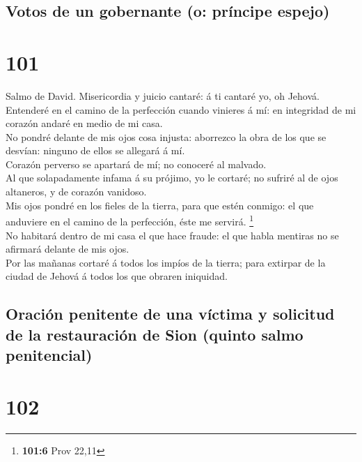 \hypertarget{votos-de-un-gobernante-o-pruxedncipe-espejo}{%
\subsection{Votos de un gobernante (o: príncipe
espejo)}\label{votos-de-un-gobernante-o-pruxedncipe-espejo}}

\hypertarget{section-100}{%
\section{101}\label{section-100}}

 Salmo de David. Misericordia y juicio cantaré: á ti
cantaré yo, oh Jehová.\\
 Entenderé en el camino de la perfección cuando vinieres á
mí: en integridad de mi corazón andaré en medio de mi casa.\\
 No pondré delante de mis ojos cosa injusta: aborrezco la
obra de los que se desvían: ninguno de ellos se allegará á mí.\\
 Corazón perverso se apartará de mí; no conoceré al
malvado.\\
 Al que solapadamente infama á su prójimo, yo le cortaré;
no sufriré al de ojos altaneros, y de corazón vanidoso.\\
 Mis ojos pondré en los fieles de la tierra, para que
estén conmigo: el que anduviere en el camino de la perfección, éste me
servirá. \footnote{\textbf{101:6} Prov 22,11}\\
 No habitará dentro de mi casa el que hace fraude: el que
habla mentiras no se afirmará delante de mis ojos.\\
 Por las mañanas cortaré á todos los impíos de la tierra;
para extirpar de la ciudad de Jehová á todos los que obraren iniquidad.

\hypertarget{oraciuxf3n-penitente-de-una-vuxedctima-y-solicitud-de-la-restauraciuxf3n-de-sion-quinto-salmo-penitencial}{%
\subsection{Oración penitente de una víctima y solicitud de la
restauración de Sion (quinto salmo
penitencial)}\label{oraciuxf3n-penitente-de-una-vuxedctima-y-solicitud-de-la-restauraciuxf3n-de-sion-quinto-salmo-penitencial}}

\hypertarget{section-101}{%
\section{102}\label{section-101}}

